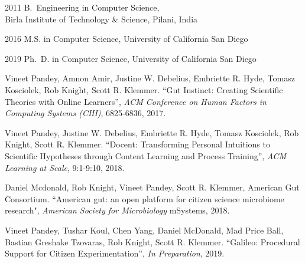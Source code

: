 \begin{frontmatter}
%
%
\begin{vitapage}
\begin{vita}
  \item[2011] B.~Engineering in Computer Science, \\Birla Institute of Technology \& Science, Pilani, India
  \item[2016] M.S. in Computer Science, University of California San Diego
  \item[2019] Ph.~D. in Computer Science, University of California San Diego
\end{vita}
\begin{publications}
 \item Vineet Pandey, Amnon Amir, Justine W. Debelius, Embriette R. Hyde, Tomasz Kosciolek, Rob Knight, Scott R. Klemmer. ``Gut Instinct: Creating Scientific Theories
with Online Learners'', \emph{ACM Conference on Human Factors in Computing Systems (CHI)}, 6825-6836, 2017.
\item Vineet Pandey, Justine W. Debelius, Embriette R. Hyde, Tomasz Kosciolek, Rob Knight, Scott R. Klemmer. ``Docent: Transforming Personal Intuitions to Scientific Hypotheses
through Content Learning and Process Training'', \emph{ACM Learning at Scale}, 9:1-9:10,  2018.
\item Daniel Mcdonald, Rob Knight, Vineet Pandey, Scott R. Klemmer, American Gut Consortium. ``American gut: an open platform for citizen science microbiome research",  \emph{American Society for Microbiology} mSystems, 2018. 
\item Vineet Pandey, Tushar Koul, Chen Yang, Daniel McDonald, Mad Price Ball, Bastian Greshake Tzovaras, Rob Knight, Scott R. Klemmer. ``Galileo: Procedural Support for Citizen Experimentation'', \emph{In Preparation},  2019.

\vspace{0.25in}


\end{publications}
\end{vitapage}
\end{frontmatter}
